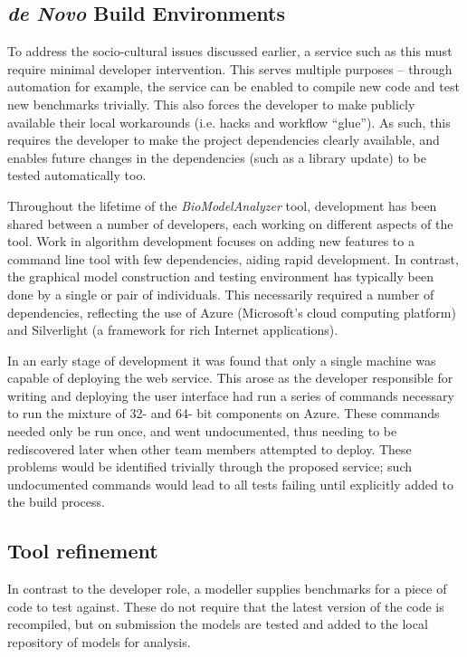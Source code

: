 \documentclass[conference]{IEEEtran}
\begin{document}
\subsection{{\emph{de Novo}} Build Environments}

To address the socio-cultural issues discussed earlier, a
service such as this must require minimal developer intervention.
This serves multiple purposes -- through automation for example, the
service can be enabled to compile new code and test new benchmarks
trivially. This also forces the developer to make publicly available
their local workarounds (i.e. hacks and workflow ``glue''). As such, this requires the
developer to make the project dependencies clearly available, and
enables future changes in the dependencies (such as a library update)
to be tested automatically too.

Throughout the lifetime of the {\emph{BioModelAnalyzer}} tool,
development has been shared between a number of developers, each
working on different aspects of the tool. Work in algorithm
development focuses on adding new features to a command line tool with
few dependencies, aiding rapid development. In contrast, the graphical
model construction and testing environment has typically been done by
a single or pair of individuals.  This necessarily required a number
of dependencies, reflecting the use of Azure (Microsoft's cloud
computing platform) and Silverlight (a framework for rich Internet
applications).

In an early stage of development it was found that only a single
machine was capable of deploying the web service. This arose as the
developer responsible for writing and deploying the user interface had
run a series of commands necessary to run the mixture of 32- and 64-
bit components on Azure. These commands needed only be run once, and
went undocumented, thus needing to be rediscovered later when other
team members attempted to deploy. These problems would be identified
trivially through the proposed service; such undocumented commands
would lead to all tests failing until explicitly added to the build
process.

\subsection{Tool refinement}

In contrast to the developer role, a modeller supplies benchmarks for
a piece of code to test against. These do not require that the latest
version of the code is recompiled, but on submission the models are
tested and added to the local repository of models for analysis.
\end{document}
